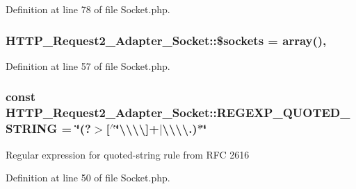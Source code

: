 Definition at line 78 of file Socket.\+php.

\hypertarget{classHTTP__Request2__Adapter__Socket_ac7d848682d9289b2c270abb214338455}{}
\subsubsection[{\$sockets}]{\setlength{\rightskip}{0pt plus 5cm}H\+T\+T\+P\+\_\+\+Request2\+\_\+\+Adapter\+\_\+\+Socket\+::\$sockets = array()\hspace{0.3cm}{\ttfamily [static]}, {\ttfamily [protected]}}\label{classHTTP__Request2__Adapter__Socket_ac7d848682d9289b2c270abb214338455}


Definition at line 57 of file Socket.\+php.

\hypertarget{classHTTP__Request2__Adapter__Socket_a6c107bbe3366105b84ab79ccedda35c9}{}
\subsubsection[{R\+E\+G\+E\+X\+P\+\_\+\+Q\+U\+O\+T\+E\+D\+\_\+\+S\+T\+R\+I\+N\+G}]{\setlength{\rightskip}{0pt plus 5cm}const H\+T\+T\+P\+\_\+\+Request2\+\_\+\+Adapter\+\_\+\+Socket\+::\+R\+E\+G\+E\+X\+P\+\_\+\+Q\+U\+O\+T\+E\+D\+\_\+\+S\+T\+R\+I\+N\+G = \textquotesingle{}\char`\"{}(?$>$\mbox{[}$^\wedge$\char`\"{}\textbackslash{}\textbackslash{}\textbackslash{}\textbackslash{}\mbox{]}+$\vert$\textbackslash{}\textbackslash{}\textbackslash{}\textbackslash{}.)$\ast$\char`\"{}\textquotesingle{}}\label{classHTTP__Request2__Adapter__Socket_a6c107bbe3366105b84ab79ccedda35c9}
Regular expression for \textquotesingle{}quoted-\/string\textquotesingle{} rule from R\+F\+C 2616 

Definition at line 50 of file Socket.\+php.

